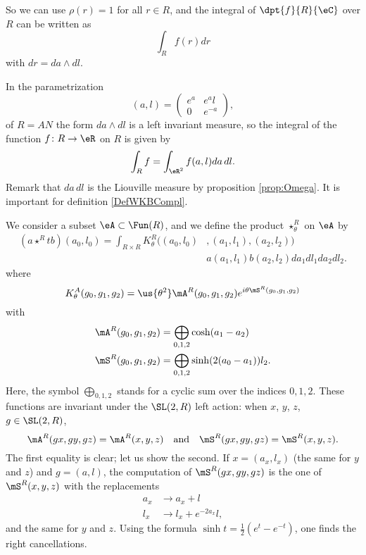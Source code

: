So we can use $\rho(r)=1$ for all $r\in R$, and the integral of $\dpt{f}{R}{\eC}$ over $R$ can be written as
\[
\int_Rf(r)dr
\]
with $dr=da\wedge dl$.

In the parametrization 
\[ 
  (a,l)=\begin{pmatrix}
 e^{a}      &  e^{a}l\\
0       &    e^{-a}
\end{pmatrix},
\]
of $R=AN$ the form $da\wedge dl$ is a left invariant measure, so the integral of the function $f\colon R\to \eR$ on $R$ is given by
\[ 
  \int_R f=\int_{\eR^2} f(a,l)da\,dl.
\]
Remark that $da\,dl$ is the Liouville measure by proposition \ref{prop:Omega}. It is important for definition \ref{DefWKBCompl}.

We consider a subset $\eA\subset\Fun(R)$, and we define the product $\star^{R}_{\theta}$ on $\eA$ by
\begin{equation}\label{eq:star_R}
\begin{split}
(a\star^{R}t b)(a_0,l_0)
=\int_{R\times R}K^R_{\theta}\big((a_0,l_0)&,(a_1,l_1),(a_2,l_2)\big)\\
                                           &a(a_1,l_1)b(a_2,l_2)da_1dl_1da_2dl_2.
\end{split}
\end{equation}
where
\[
K_{\theta}^A(g_0,g_1,g_2)=\us{\theta^2}\mA^R(g_0,g_1,g_2)e^{i\theta \mS^R(g_0,g_1,g_2)}
\]
 with
\begin{subequations}
\begin{align}
  \mA^R(g_0,g_1,g_2)&=\bigoplus_{0,1,2}\cosh(a_1-a_2)\\
  \mS^R(g_0,g_1,g_2)&=\bigoplus_{0,1,2}\sinh(2(a_0-a_1))l_2.
\end{align}
\end{subequations}
Here, the symbol $\bigoplus_{0,1,2}$ stands for a cyclic sum over the indices $0,1,2$.
These functions are invariant under the $\SL(2,R)$ left action: when $x$, $y$, $z$, $g\in\SL(2,R)$,
\begin{equation}
 \mA^R(gx,gy,gz)=\mA^R(x,y,z)\quad\text{and}\quad \mS^R(gx,gy,gz)=\mS^R(x,y,z).
\end{equation}
 The first equality is clear; let us show the second. If $x=(a_x,l_x)$ (the same for $y$ and $z$) and $g=(a,l)$, the computation of $\mS^R(gx,gy,gz)$ is the one of $\mS^R(x,y,z)$ with the replacements
\begin{subequations}
\begin{align}
a_x&\rightarrow a_x+l\\
l_x&\rightarrow l_x+e^{-2a_x}l,
\end{align}
\end{subequations}
and the same for $y$ and $z$. Using the formula $\sinh t=\frac{1}{2}(e^{t}-e^{-t})$, one finds the right cancellations.

